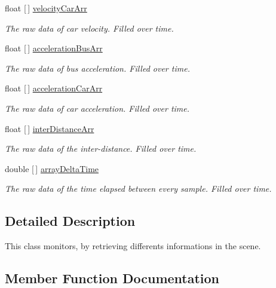 \begin{DoxyCompactItemize}
float \mbox{[}$\,$\mbox{]} \hyperlink{classmonitoring_ad1c1a9788538be54e5cc7cf23d11424e}{velocity\+Car\+Arr}
\begin{DoxyCompactList}\small\item\em The raw data of car velocity. Filled over time.\end{DoxyCompactList}\item 
float \mbox{[}$\,$\mbox{]} \hyperlink{classmonitoring_acf6692391e841215c8dbeec584100901}{acceleration\+Bus\+Arr}
\begin{DoxyCompactList}\small\item\em The raw data of bus acceleration. Filled over time.\end{DoxyCompactList}\item 
float \mbox{[}$\,$\mbox{]} \hyperlink{classmonitoring_a1dba43f12e646b6d346eaa1a406f6c68}{acceleration\+Car\+Arr}
\begin{DoxyCompactList}\small\item\em The raw data of car acceleration. Filled over time.\end{DoxyCompactList}\item 
float \mbox{[}$\,$\mbox{]} \hyperlink{classmonitoring_a02f147c189ffeb8d4bd454ad353d98df}{inter\+Distance\+Arr}
\begin{DoxyCompactList}\small\item\em The raw data of the inter-\/distance. Filled over time.\end{DoxyCompactList}\item 
double \mbox{[}$\,$\mbox{]} \hyperlink{classmonitoring_aa93593cba4aa6835e47e3714106e0afb}{array\+Delta\+Time}
\begin{DoxyCompactList}\small\item\em The raw data of the time elapsed between every sample. Filled over time.\end{DoxyCompactList}\end{DoxyCompactItemize}


\subsection{Detailed Description}
This class monitors, by retrieving differents informations in the scene. 



\subsection{Member Function Documentation}
\mbox{\label{classmonitoring_af09a1f1c17d9523758c57e7808afc81d}} 
